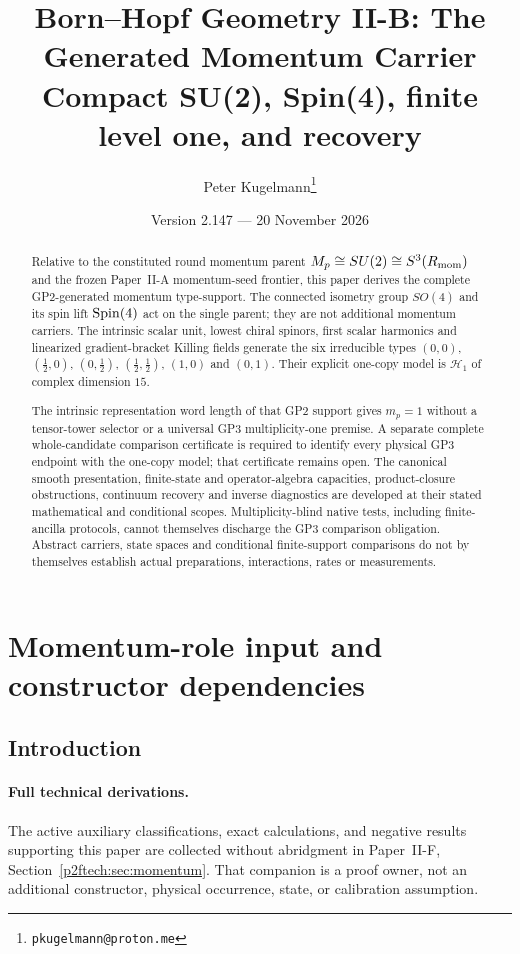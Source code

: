 \documentclass[12pt,a4paper]{article}
\title{\textbf{Born--Hopf Geometry II-B: The Generated Momentum Carrier}\\[0.5em]
\large Compact SU(2), Spin(4), finite level one, and recovery}
\author{Peter Kugelmann\thanks{\texttt{pkugelmann@proton.me}}}
\date{Version 2.147 --- 20 November 2026}
\begin{document}
\maketitle

\begin{abstract}
Relative to the constituted round momentum parent
$M_p\cong SU(2)\cong S^3(R_{\mathrm{mom}})$ and the frozen
Paper~II-A momentum-seed frontier, this paper derives the complete
GP2-generated momentum type-support.  The connected isometry group
$SO(4)$ and its spin lift $\mathrm{Spin}(4)$ act on the single parent; they
are not additional momentum carriers.  The intrinsic scalar unit,
lowest chiral spinors, first scalar harmonics and linearized
gradient-bracket Killing fields generate the six irreducible types
$(0,0)$, $(\frac12,0)$, $(0,\frac12)$, $(\frac12,\frac12)$,
$(1,0)$ and $(0,1)$.  Their explicit one-copy model is
$\mathcal H_1$ of complex dimension $15$.

The intrinsic representation word length of that GP2 support gives
$m_p=1$ without a tensor-tower selector or a universal GP3
multiplicity-one premise.  A separate complete whole-candidate
comparison certificate is required to identify every physical GP3
endpoint with the one-copy model; that certificate remains open.
The canonical smooth presentation, finite-state and operator-algebra
capacities, product-closure obstructions, continuum recovery and
inverse diagnostics are developed at their stated mathematical
and conditional scopes.  Multiplicity-blind native tests, including
finite-ancilla protocols, cannot themselves discharge the GP3
comparison obligation.  Abstract carriers, state spaces and
conditional finite-support comparisons do not by themselves establish
actual preparations, interactions, rates or measurements.
\end{abstract}

\tableofcontents
\listoftables
\newpage

\section{Momentum-role input and constructor dependencies}
\label{paper2b:sec:organized-scope}

\subsection{Introduction}
\label{p2b:sec:introduction}

\paragraph{Full technical derivations.}
The active auxiliary classifications, exact calculations, and negative
results supporting this paper are collected without abridgment in
Paper~II-F, Section~\ref{p2ftech:sec:momentum}.
That companion is a proof owner, not an additional constructor,
physical occurrence, state, or calibration assumption.
\end{document}
